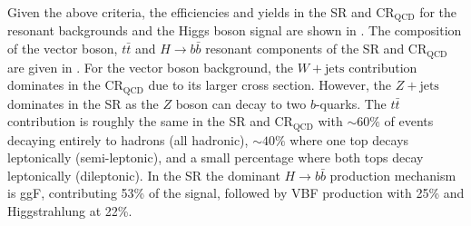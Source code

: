 Given the above criteria, the efficiencies and yields in the SR and
$\text{CR}_{\text{QCD}}$ for the resonant backgrounds and the Higgs boson
signal are shown in . The composition of the  vector boson, $t\bar{t}$ and $H
\rightarrow b\bar{b}$ resonant components of the SR and
$\text{CR}_{\text{QCD}}$ are given in . For the vector boson background,
the $W+\text{jets}$ contribution dominates in the $\text{CR}_{\text{QCD}}$ due to its
larger cross section.  However, the $Z+\text{jets}$ dominates in the SR as the $Z$
boson can decay to two $b$-quarks.  The $t\bar{t}$
contribution is roughly the same in the SR and $\text{CR}_{\text{QCD}}$ with
$\sim 60\%$ of events decaying entirely to hadrons (all hadronic), $\sim 40\%$
where one top decays leptonically (semi-leptonic), and a small percentage where
both tops decay leptonically (dileptonic). In the SR the dominant $H
\rightarrow b\bar{b}$ production mechanism is ggF, contributing 53\% of the
signal, followed by VBF production with 25\% and Higgstrahlung at 22\%. 

